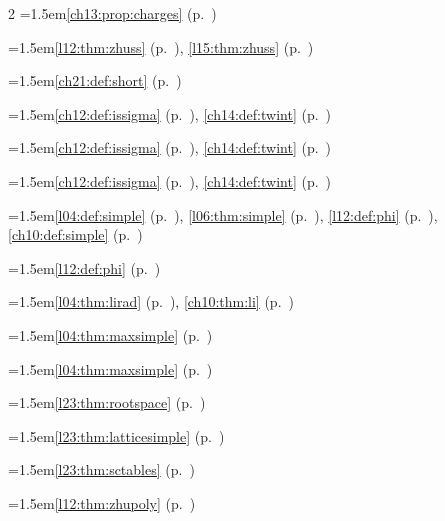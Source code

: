 \begin{multicols}{2}
\hangindent=1.5em\quad \ref{ch13:prop:charges} (p.~\pageref{ch13:prop:charges})\par
\hangindent=1.5em\quad \ref{l12:thm:zhuss} (p.~\pageref{l12:thm:zhuss}), \ref{l15:thm:zhuss} (p.~\pageref{l15:thm:zhuss})\par
\hangindent=1.5em\quad \ref{ch21:def:short} (p.~\pageref{ch21:def:short})\par
\hangindent=1.5em\quad \ref{ch12:def:issigma} (p.~\pageref{ch12:def:issigma}), \ref{ch14:def:twint} (p.~\pageref{ch14:def:twint})\par
\hangindent=1.5em\quad \ref{ch12:def:issigma} (p.~\pageref{ch12:def:issigma}), \ref{ch14:def:twint} (p.~\pageref{ch14:def:twint})\par
\hangindent=1.5em\quad \ref{ch12:def:issigma} (p.~\pageref{ch12:def:issigma}), \ref{ch14:def:twint} (p.~\pageref{ch14:def:twint})\par
\hangindent=1.5em\quad \ref{l04:def:simple} (p.~\pageref{l04:def:simple}), \ref{l06:thm:simple} (p.~\pageref{l06:thm:simple}), \ref{l12:def:phi} (p.~\pageref{l12:def:phi}), \ref{ch10:def:simple} (p.~\pageref{ch10:def:simple})\par
\hangindent=1.5em\quad \ref{l12:def:phi} (p.~\pageref{l12:def:phi})\par
\hangindent=1.5em\quad \ref{l04:thm:lirad} (p.~\pageref{l04:thm:lirad}), \ref{ch10:thm:li} (p.~\pageref{ch10:thm:li})\par
\hangindent=1.5em\quad \ref{l04:thm:maxsimple} (p.~\pageref{l04:thm:maxsimple})\par
\hangindent=1.5em\quad \ref{l04:thm:maxsimple} (p.~\pageref{l04:thm:maxsimple})\par
\hangindent=1.5em\quad \ref{l23:thm:rootspace} (p.~\pageref{l23:thm:rootspace})\par
\hangindent=1.5em\quad \ref{l23:thm:latticesimple} (p.~\pageref{l23:thm:latticesimple})\par
\hangindent=1.5em\quad \ref{l23:thm:sctables} (p.~\pageref{l23:thm:sctables})\par
\hangindent=1.5em\quad \ref{l12:thm:zhupoly} (p.~\pageref{l12:thm:zhupoly})\par

\end{multicols}
